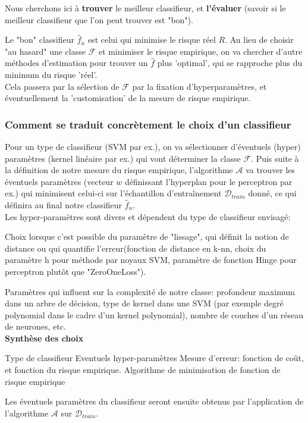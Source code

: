 \documentclass[a4paper]{article}
\theoremstyle{plain}
\begin{document}
Nous cherchons ici à \textbf{trouver} le meilleur classifieur, et \textbf{l'évaluer} (savoir si le meilleur classifieur que l'on peut trouver est "bon"). 

Le "bon" classifieur $\hat f_n$ est celui qui minimise le risque réel $R$. Au lieu de choisir "au hasard" une classe $\mathcal{F}$ et minimiser le risque empirique, on va chercher d'autre méthodes d'estimation pour trouver un $\hat f$ plus 'optimal', qui se rapproche plus du minimum du risque 'réel'.\\

Cela passera par la sélection de $\mathcal{F}$ par la fixation d'hyperparamètres, et éventuellement la 'customisation' de la mesure de risque empirique.\\


\subsubsection{Comment se traduit concrètement le choix d'un classifieur}

Pour un type de classifieur (SVM par ex.), on va sélectionner d'éventuels (hyper) paramètres (kernel linéaire par ex.) qui vont déterminer la classe $\mathcal{F}$. Puis suite à la définition de notre mesure du risque empirique, l'algorithme $\mathcal{A}$  va trouver les éventuels paramètres (vecteur $w$ définissant l'hyperplan pour le perceptron par ex.) qui minimisent celui-ci sur l'échantillon d'entraînement $\mathcal{D}_{train}$ donné, ce qui définira au final notre classifieur $\hat f_n$.\\


Les hyper-paramètres sont divers et dépendent du type de classifieur envisagé:

Choix lorsque c'est possible du paramètre de "lissage", qui définit la notion de distance ou qui quantifie l'erreur(fonction de distance en k-nn, choix du paramètre h pour méthode par noyaux SVM, paramètre de fonction Hinge pour perceptron plutôt que "ZeroOneLoss").

Paramètres qui influent sur la complexité de notre classe: profondeur maximum dans un arbre de décision, type de kernel dans une SVM (par exemple degré polynomial dans le cadre d'un kernel polynomial), nombre de couches d'un réseau de neurones, etc. \\

\textbf{Synthèse des choix}
\begin{outline}
\1 Type de classifieur
\1 Eventuels hyper-paramètres
\1 Mesure d'erreur: fonction de coût, et fonction du risque empirique.
\1 Algorithme de minimisation de fonction de risque empirique
\end{outline}
Les éventuels paramètres du classifieur seront ensuite obtenus par l'application de l'algorithme $\mathcal{A}$ sur $\mathcal{D}_{train}$.
\end{document}
